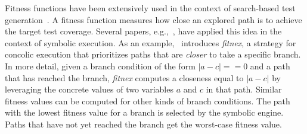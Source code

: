 Fitness functions have been extensively used in the context of search-based test generation~\cite{M-STVR04}. A fitness function measures how close an explored path is to achieve the target test coverage. Several papers, e.g.,~\cite{XTD-DSN09,CS-CACM13,XTD-DSN09}, have applied this idea in the context of symbolic execution. As an example,~\cite{XTD-DSN09} introduces {\em fitnex}, a strategy for concolic execution that prioritizes paths that are {\em closer} to take a specific branch. In more detail, given a branch condition of the form $|a - c| == 0$ and a path that has reached the branch, {\em fitnex} computes a closeness equal to $|a - c|$ by leveraging the concrete values of two variables $a$ and $c$ in that path. Similar fitness values can be computed for other kinds of branch conditions. The path with the lowest fitness value for a branch is selected by the symbolic engine. Paths that have not yet reached the branch get the worst-case fitness value.

